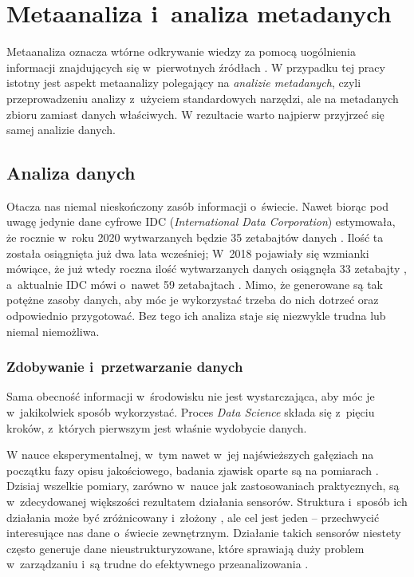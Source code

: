 \chapter{Metaanaliza i~analiza metadanych}

Metaanaliza oznacza wtórne odkrywanie wiedzy za pomocą uogólnienia informacji znajdujących się w~pierwotnych źródłach \cite{higgins2019cochrane}.
W przypadku tej pracy istotny jest aspekt metaanalizy polegający na \textit{analizie metadanych}, czyli przeprowadzeniu analizy z~użyciem standardowych narzędzi, ale na metadanych zbioru zamiast danych właściwych.
W rezultacie warto najpierw przyjrzeć się samej analizie danych.

\section{Analiza danych}

Otacza nas niemal nieskończony zasób informacji o~świecie.
Nawet biorąc pod uwagę jedynie dane cyfrowe IDC (\textit{International Data Corporation}) estymowała, że rocznie w~roku 2020 wytwarzanych będzie 35 zetabajtów danych \cite{tien2013big}.
Ilość ta została osiągnięta już dwa lata wcześniej; W~2018 pojawiały się wzmianki mówiące, że już wtedy roczna ilość wytwarzanych danych osiągnęła 33 zetabajty \cite{Patrizio:2018}, a~aktualnie IDC mówi o~nawet 59 zetabajtach \cite{IDC:2020}.
Mimo, że generowane są tak potężne zasoby danych, aby móc je wykorzystać trzeba do nich dotrzeć oraz odpowiednio przygotować.
Bez tego ich analiza staje się niezwykle trudna lub niemal niemożliwa.

	\subsection{Zdobywanie i~przetwarzanie danych}
	Sama obecność informacji w~środowisku nie jest wystarczająca, aby móc je w~jakikolwiek sposób wykorzystać.
	Proces \textit{Data Science} składa się z~pięciu kroków, z~których pierwszym jest właśnie wydobycie danych.

	W nauce eksperymentalnej, w~tym nawet w~jej najświeższych gałęziach na początku fazy opisu jakościowego, badania zjawisk oparte są na pomiarach \cite{brandt1998data}.
	Dzisiaj wszelkie pomiary, zarówno w~nauce jak zastosowaniach praktycznych, są w~zdecydowanej większości rezultatem działania sensorów.
	Struktura i~sposób ich działania może być zróżnicowany i~złożony \cite{deshpande2004model,boyer2009scada}, ale cel jest jeden -- przechwycić interesujące nas dane o~świecie zewnętrznym.
	Działanie takich sensorów niestety często generuje dane nieustrukturyzowane, które sprawiają duży problem w~zarządzaniu i~są trudne do efektywnego przeanalizowania \cite{blumberg2003problem}.

